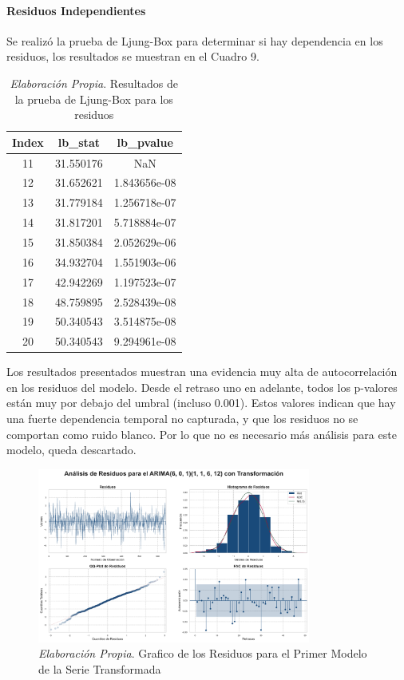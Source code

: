 \documentclass[12pt,letterpaper]{article}   %
\begin{document}
\paragraph{Residuos Independientes}
Se realizó la prueba de Ljung-Box para determinar si hay dependencia en los residuos, los resultados se muestran en el Cuadro 9.


\begin{table}[ht]
\footnotesize
\centering
\begin{tabular}{ccc}
\hline
\textbf{Index} & \textbf{lb\_stat} & \textbf{lb\_pvalue} \\
\hline
11 & 31.550176 & NaN \\
12 & 31.652621 & 1.843656e-08 \\
13 & 31.779184 & 1.256718e-07 \\
14 & 31.817201 & 5.718884e-07 \\
15 & 31.850384 & 2.052629e-06 \\
16 & 34.932704 & 1.551903e-06 \\
17 & 42.942269 & 1.197523e-07 \\
18 & 48.759895 & 2.528439e-08 \\
19 & 50.340543 & 3.514875e-08 \\
20 & 50.340543 & 9.294961e-08 \\
\hline
\end{tabular}
\caption{\textit{Elaboración Propia}. Resultados de la prueba de Ljung-Box para los residuos}
\end{table}


Los resultados presentados muestran una evidencia muy alta de autocorrelación en los residuos del modelo. Desde el retraso uno en adelante, todos los p-valores están muy por debajo del umbral (incluso 0.001). Estos valores indican que hay una fuerte dependencia temporal no capturada, y que los residuos no se comportan como ruido blanco. Por lo que no es necesario más análisis para este modelo, queda descartado.



\begin{figure}[ht]
    \centering
    \includegraphics[width=0.8\textwidth]{imagenes/04-04-analisis-de-residuos-m1.pdf}
    \caption{\textit{Elaboración Propia}. Grafico de los Residuos para el Primer Modelo de la Serie Transformada}
\end{figure}
\end{document}
